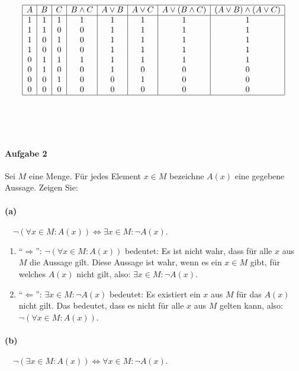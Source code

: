 \documentclass[12pt, letterpaper]{article}
\begin{document}
\[
\begin{array}{|c|c|c|c|c|c|c|c|}
\hline
A & B & C & B \land C & A \lor B & A \lor C & A \lor (B \land C) & (A \lor B) \land (A \lor C) \\
\hline
1 & 1 & 1 & 1 & 1 & 1 & 1 & 1 \\
1 & 1 & 0 & 0 & 1 & 1 & 1 & 1 \\
1 & 0 & 1 & 0 & 1 & 1 & 1 & 1 \\
1 & 0 & 0 & 0 & 1 & 1 & 1 & 1 \\
0 & 1 & 1 & 1 & 1 & 1 & 1 & 1 \\
0 & 1 & 0 & 0 & 1 & 0 & 0 & 0 \\
0 & 0 & 1 & 0 & 0 & 1 & 0 & 0 \\
0 & 0 & 0 & 0 & 0 & 0 & 0 & 0 \\
\hline
\end{array}
\]\\ \\ \\






\paragraph{Aufgabe 2}

\noindent Sei $M$ eine Menge. Für jedes Element $x \in M$ bezeichne $A(x)$ eine gegebene Aussage. Zeigen Sie:

\paragraph{(a)} $\quad \neg \left( \forall x \in M : A(x) \right) \Leftrightarrow \exists x \in M : \neg A(x).$

\begin{enumerate}
    \item[]{``$\Rightarrow$'':}
            $\neg \left( \forall x \in M : A(x) \right)$ bedeutet: Es ist nicht wahr, dass für alle $x$ aus $M$ die Aussage gilt.
            Diese Aussage ist wahr, wenn es ein $x \in M$ gibt, für welches $A(x)$ nicht gilt, also: $\exists x \in M : \neg A(x)$.
    \item[]{``$\Leftarrow$'':}
            $\exists x \in M : \neg A(x)$ bedeutet: Es existiert ein $x$ aus $M$ für das $A(x)$ nicht gilt. Das bedeutet, dass es nicht für alle $x$ aus $M$ gelten kann, also: $\neg \left( \forall x \in M : A(x) \right)$.
\end{enumerate}

\paragraph{(b)} $\quad \neg \left( \exists x \in M : A(x) \right) \Leftrightarrow \forall x \in M : \neg A(x).$
\end{document}
